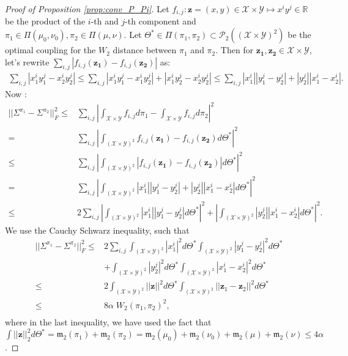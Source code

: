 \documentclass{article}
\newcommand{\R}{\mathbb{R}}
\newcommand{\Y}{\mathcal{Y}}
\newcommand{\X}{\mathcal{X}}
\newcommand{\1}{\mathbf{1}}
\renewcommand{\P}{\mathcal{P}}
\theoremstyle{definition}
\theoremstyle{remark}
\begin{document}
\begin{appendices}
\begin{proof}[Proof of Proposition \ref{prop:conv_P_Pi}]
    Let $f_{i,j}: \mathbf{z}=(x,y)\in\X\times\Y\mapsto  x^iy^j\in\R$ be the product of the $i$-th and $j$-th component and $\pi_1\in \Pi(\mu_0,\nu_0),\pi_2\in  \Pi(\mu,\nu)$. Let $\Theta^*\in \Pi(\pi_1,\pi_2)\subset\P_2((\X\times\Y)^2)$ be  the optimal coupling for the $W_2$ distance between $\pi_1$ and $\pi_2$. Then for  $\mathbf{z_1},\mathbf{z_2}\in \X\times\Y$, let's rewrite $\sum_{i,j}|f_{i,j}(\mathbf{z_1})-f_{i,j}(\mathbf{z_2})|$ as:
    \begin{equation*}
        \begin{split}
             \sum_{i,j}|x_1^iy_1^j-x_2^iy_2^j|\leq \sum_{i,j}|x_1^iy_1^j-x_1^iy_2^j|+|x_1^iy_2^j-x_2^iy_2^j|
            \leq \sum_{i,j} |x_1^i||y_1^j-y_2^j|+|y_2^j||x_1^i-x_2^i|.
        \end{split}
    \end{equation*}
    Now :
    \begin{equation*}
        \begin{split}
            ||\Sigma^{\pi_1}-\Sigma^{\pi_2}||_F^2 \leq & \sum_{i,j}\left|\int_{\X\times\Y} f_{i,j} d\pi_1-\int_{\X\times\Y} f_{i,j}d\pi_2\right|^2\\
            =& \sum_{i,j}\left|\int_{(\X\times\Y)^2} f_{i,j}(\mathbf{z_1})-f_{i,j}(\mathbf{z_2}) d\Theta^*\right|^2\\
            \leq & \sum_{i,j}\left|\int_{(\X\times\Y)^2} \left|f_{i,j}(\mathbf{z_1})-f_{i,j}(\mathbf{z_2})\right| d\Theta^*\right|^2\\
            =&\sum_{i,j}\left|\int_{(\X\times\Y)^2} |x_1^i||y_1^j-y_2^j|+|y_2^j||x_1^i-x_2^i| d\Theta^*\right|^2\\
            \leq & 2 \sum_{i,j}\left|\int_{(\X\times\Y)^2} |x_1^i||y_1^j-y_2^j| d\Theta^*\right|^2+\left|\int_{(\X\times\Y)^2}|y_2^j||x_1^i-x_2^i| d\Theta^*\right|^2.
        \end{split}
    \end{equation*}
    We use the Cauchy Schwarz inequality, such that 
    \begin{equation*}
        \begin{split}
            ||\Sigma^{\pi_1}-\Sigma^{\pi_2}||_F^2 \leq &2 \sum_{i,j}\int_{(\X\times\Y)^2}|x_1^i|^2d\Theta^*\int_{(\X\times\Y)^2}|y_1^j-y_2^j|^2d\Theta^*\\ 
            &+\int_{(\X\times\Y)^2}|y_2^j|^2d\Theta^*\int_{(\X\times\Y)^2}|x_1^i-x_2^i|^2d\Theta^*\\
            \leq &  2 \int_{(\X\times\Y)^2}||\mathbf{z}||^2d\Theta^*\int_{(\X\times\Y)^2}||\mathbf{z}_1-\mathbf{z}_2||^2d\Theta^*\\
            \leq &  8\alpha\;W_2(\pi_1,\pi_2)^2,\\
        \end{split}
    \end{equation*}
    where in the last inequality, we have used the fact that $ \int ||\mathbf{z}||_2^2 d\Theta^* =\mathfrak{m}_2 (\pi_1)+\mathfrak{m}_2(\pi_2) =   \mathfrak{m}_2(\mu_0)+\mathfrak{m}_2(\nu_{0})+\mathfrak{m}_2(\mu)+\mathfrak{m}_2(\nu)\leq 4 \alpha$.  
    

\end{proof}
\end{appendices}
\end{document}
